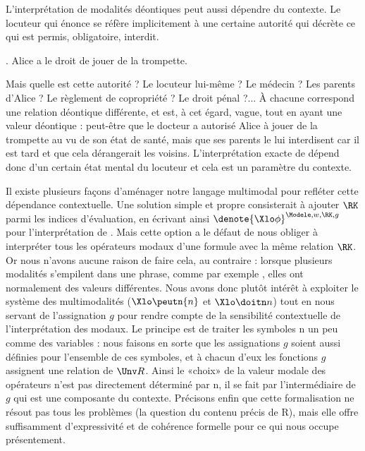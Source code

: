 L'interprétation de modalités déontiques peut aussi dépendre du contexte. Le locuteur qui énonce {\Next} se réfère implicitement à une certaine autorité qui décrète ce qui est permis, obligatoire, interdit.

\ex. Alice a le droit de jouer de la trompette.

Mais quelle est cette autorité ? Le locuteur lui-même ? Le médecin ? Les parents d'Alice ? Le règlement de copropriété ? Le droit pénal ?...  À chacune correspond une relation déontique différente, et {\Last} est, à cet égard, vague,  tout en ayant une valeur déontique : peut-être que le docteur a autorisé Alice à jouer de la trompette au vu de son état de santé, mais que ses parents le lui interdisent car il est tard et que cela dérangerait les voisins.  L'interprétation exacte de {\Last} dépend donc d'un certain état mental du locuteur et cela est un paramètre du contexte. 

Il existe plusieurs façons d'aménager notre langage {\LO} multimodal pour refléter cette dépendance contextuelle. 
Une solution simple et propre consisterait à ajouter $\RK$ parmi les indices d'évaluation, en écrivant ainsi \(\denote{\Xlo\phi}^{\Modele,w,\RK,g}\) pour l'interprétation de \vrb\phi.  Mais cette option a le défaut de nous obliger à interpréter tous les opérateurs modaux d'une formule avec la même relation $\RK$. Or nous n'avons aucune raison de faire cela, au contraire : lorsque plusieurs modalités s'empilent dans une phrase, comme par exemple , elles ont normalement des valeurs différentes.
Nous avons donc plutôt intérêt à exploiter le système des multimodalités ($\Xlo\peutn{n}$ et $\Xlo\doitn n$) tout en nous servant de l'assignation $g$ pour rendre compte de la sensibilité contextuelle de l'interprétation des modaux. 
Le principe est de traiter les symboles \vrb n un peu comme des variables : 
nous faisons en sorte que les assignations $g$ soient aussi définies pour l'ensemble de ces symboles, et à chacun d'eux les fonctions $g$ assignent une relation de $\Unv R$. Ainsi le «choix» de la valeur modale des opérateurs n'est pas directement déterminé par \vrb n, il se fait par l'intermédiaire de $g$ qui est une composante du contexte.  Précisons enfin que cette formalisation ne résout pas tous les problèmes (\cf la question du contenu précis de \Unv R), mais elle offre suffisamment d'expressivité et de cohérence formelle pour ce qui nous occupe présentement.





